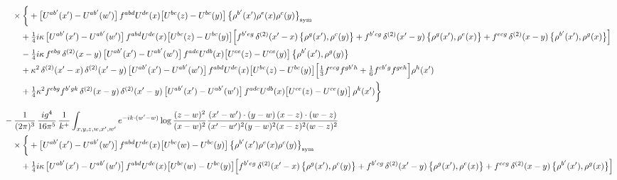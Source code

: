 \documentclass[10pt]{article}
\numberwithin{equation}{section}
\begin{document}
\begin{align}
&\quad\times\bigg\{+\big[U^{ab^{\prime}}(x^{\prime})-U^{ab^{\prime}}(w^{\prime})\big]\,f^{abd}U^{de}(x)\big[U^{bc}(z)-U^{bc}(y)\big]\,\big\{\rho^{b^{\prime}}(x^{\prime})\rho^{e}(x)\rho^{c}(y)\big\}_{\rm sym}\notag\\
&\qquad+\tfrac14 i\kappa\,\big[U^{ab^{\prime}}(x^{\prime})-U^{ab^{\prime}}(w^{\prime})\big]\,f^{abd}U^{de}(x)\big[U^{bc}(z)-U^{bc}(y)\big]\Big[f^{b^{\prime}eg}\,\delta^{(2)}(x^{\prime}-x)\,\big\{\rho^{g}(x^{\prime}),\rho^{c}(y)\big\}+f^{b^{\prime}cg}\,\delta^{(2)}(x^{\prime}-y)\,\big\{\rho^{g}(x^{\prime}),\rho^{e}(x)\big\}+f^{ecg}\,\delta^{(2)}(x-y)\,\big\{\rho^{b^{\prime}}(x^{\prime}),\rho^{g}(x)\big\}\Big]\notag\\
&\qquad-\tfrac14 i\kappa\,f^{ebg}\,\delta^{(2)}(x-y)\,\big[U^{ab^{\prime}}(x^{\prime})-U^{ab^{\prime}}(w^{\prime})\big]\,f^{adc}U^{db}(x)\big[U^{ce}(z)-U^{ce}(y)\big]\,\big\{\rho^{b^{\prime}}(x^{\prime}),\rho^{g}(y)\big\}\notag\\
&\qquad+\kappa^{2}\,\delta^{(2)}(x^{\prime}-x)\,\delta^{(2)}(x^{\prime}-y)\,\big[U^{ab^{\prime}}(x^{\prime})-U^{ab^{\prime}}(w^{\prime})\big]\,f^{abd}U^{de}(x)\big[U^{bc}(z)-U^{bc}(y)\big]\Big[\tfrac13f^{ecg}f^{gb^{\prime}h}+\tfrac16f^{cb^{\prime}g}f^{geh}\Big]\rho^{h}(x^{\prime})\notag\\
&\qquad+\tfrac14\kappa^{2}f^{ebg}f^{b^{\prime}gk}\,\delta^{(2)}(x-y)\,\delta^{(2)}(x^{\prime}-y)\,\big[U^{ab^{\prime}}(x^{\prime})-U^{ab^{\prime}}(w^{\prime})\big]\,f^{adc}U^{db}(x)\big[U^{ce}(z)-U^{ce}(y)\big]\,\rho^{k}(x^{\prime})\bigg\}\notag\\[6pt]
&-\frac{1}{(2\pi)^{3}}\,\frac{ig^{4}}{16\pi^{5}}\,\frac{1}{k^{+}}\int_{x,y,z,w,x^{\prime},w^{\prime}}e^{-ik\cdot(w^{\prime}-w)}\log\frac{(z-w)^{2}}{(x-w)^{2}}\frac{(x^{\prime}-w^{\prime})\cdot(y-w)\,(x-z)\cdot(w-z)}{(x^{\prime}-w^{\prime})^{2}(y-w)^{2}(x-z)^{2}(w-z)^{2}}\notag\\
&\quad\times\bigg\{+\big[U^{ab^{\prime}}(x^{\prime})-U^{ab^{\prime}}(w^{\prime})\big]\,f^{abd}U^{de}(x)\big[U^{bc}(w)-U^{bc}(y)\big]\,\big\{\rho^{b^{\prime}}(x^{\prime})\rho^{e}(x)\rho^{c}(y)\big\}_{\rm sym}\notag\\
&\qquad+\tfrac14 i\kappa\,\big[U^{ab^{\prime}}(x^{\prime})-U^{ab^{\prime}}(w^{\prime})\big]\,f^{abd}U^{de}(x)\big[U^{bc}(w)-U^{bc}(y)\big]\Big[f^{b^{\prime}eg}\,\delta^{(2)}(x^{\prime}-x)\,\big\{\rho^{g}(x^{\prime}),\rho^{c}(y)\big\}+f^{b^{\prime}cg}\,\delta^{(2)}(x^{\prime}-y)\,\big\{\rho^{g}(x^{\prime}),\rho^{e}(x)\big\}+f^{ecg}\,\delta^{(2)}(x-y)\,\big\{\rho^{b^{\prime}}(x^{\prime}),\rho^{g}(x)\big\}\Big]\notag\\

\end{align}
\end{document}

